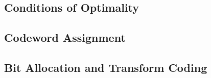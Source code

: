 \documentclass[10pt]{article}
\begin{document}
\subsection{Conditions of Optimality}
\label{sec:optim_conds_deriv}

\subsection{Codeword Assignment}
\label{sec:code_assign_deriv}

\subsection{Bit Allocation and Transform Coding}
\label{sec:bit_trans_deriv}
\end{document}
